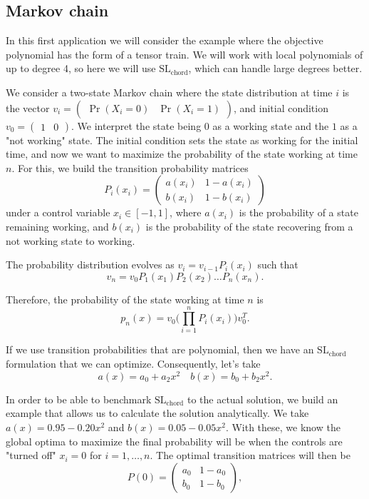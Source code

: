 \documentclass[11pt,a4paper]{article}
\theoremstyle{definition}
\begin{document}
\subsection{Markov chain}
In this first application we will consider the example where the objective polynomial has the form of a tensor train. We will work with local polynomials of up to degree 4, so here we will use $\mathrm{SL}_{\mathrm{chord}}$, which can handle large degrees better.

We consider a two-state Markov chain \cite{levin2009markov} where the state distribution at time $i$ is the vector $v_i=\begin{pmatrix}
    \Pr(X_i=0) & \Pr(X_i=1)
\end{pmatrix}$, and initial condition $v_0=\begin{pmatrix}
    1 & 0
\end{pmatrix}$. We interpret the state being $0$ as a working state and the $1$ as a "not working" state. The initial condition sets the state as working for the initial time, and now we want to maximize the probability of the state working at time $n$. For this, we build the transition probability matrices
\[
P_i(x_i)=\begin{pmatrix}
    a(x_i) & 1-a(x_i) \\ b(x_i) & 1-b(x_i)
\end{pmatrix}
\]
under a control variable $x_i\in[-1,1]$, where $a(x_i)$ is the probability of a state remaining working, and $b(x_i)$ is the probability of the state recovering from a not working state to working. 

The probability distribution evolves as $v_i=v_{i-1}P_i(x_i)$ such that 
\[
v_n=v_0 P_1(x_1)P_2(x_2)\dots P_n(x_n).
\]

Therefore, the probability of the state working at time $n$ is
\[
p_n(x)=v_0\big(\prod^n_{i=1} P_i(x_i)\big)v_0^T.
\]

If we use transition probabilities that are polynomial, then we have an $\mathrm{SL}_{\mathrm{chord}}$ formulation that we can optimize. Consequently, let's take 
\[
a(x)=a_0+a_2x^2 \quad b(x)=b_0+b_2x^2.
\]

In order to be able to benchmark $\mathrm{SL}_{\mathrm{chord}}$ to the actual solution, we build an example that allows us to calculate the solution analytically. We take $a(x)=0.95-0.20x^2$ and $b(x)=0.05-0.05x^2$. With these, we know the global optima to maximize the final probability will be when the controls are "turned off" $x_i=0$ for $i=1,\dots,n$. The optimal transition matrices will then be 
\[
P(0)=\begin{pmatrix}
    a_0 & 1-a_0\\
    b_0 & 1-b_0
\end{pmatrix},
\]
\end{document}
